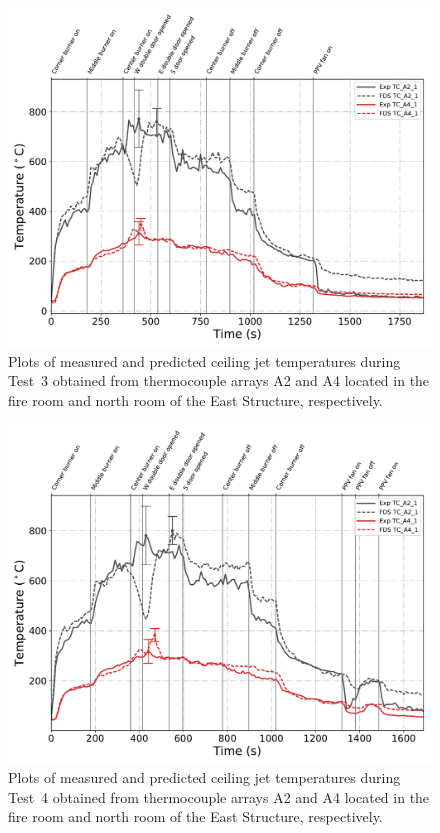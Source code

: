 \begin{figure}[!h]
	\centering
	\includegraphics[width=\columnwidth]{Figures/Plots/Validation/Temperature/Test_3_cjet_2}
	\caption[Plots of measured and predicted ceiling jet temperatures during Test~3.]{Plots of measured and predicted ceiling jet temperatures during Test~3 obtained from thermocouple arrays A2 and A4 located in the fire room and north room of the East Structure, respectively.}
	\label{fig:cjet2_data_Test3}
\end{figure}

\begin{figure}[!h]
	\centering
	\includegraphics[width=\columnwidth]{Figures/Plots/Validation/Temperature/Test_4_cjet_2}
	\caption[Plots of measured and predicted ceiling jet temperatures during Test~4.]{Plots of measured and predicted ceiling jet temperatures during Test~4 obtained from thermocouple arrays A2 and A4 located in the fire room and north room of the East Structure, respectively.}
	\label{fig:cjet2_data_Test4}
\end{figure}

